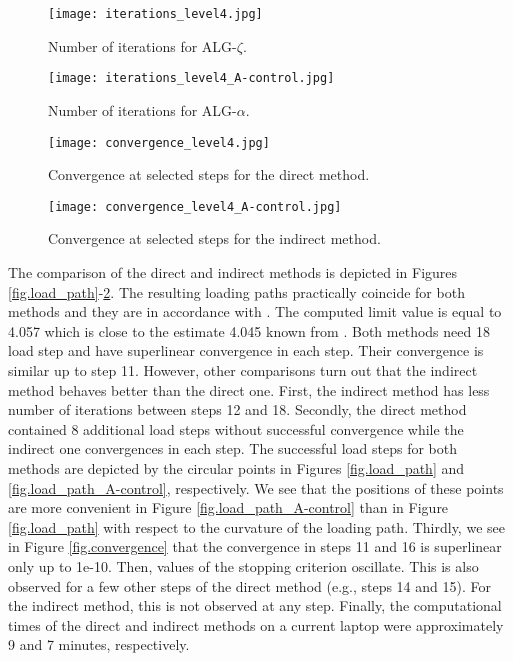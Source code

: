 \documentclass[a4paper,12pt]{article}
\theoremstyle{remark}
\numberwithin{equation}{section}
\begin{document}
\begin{figure}[htbp]
\begin{minipage}[t]{0.47\textwidth}
  \center
  \texttt{[image: iterations\_level4.jpg]}
   \caption{\small{Number of iterations for ALG-$\zeta$.}}
   \label{fig.iterations}
\end{minipage}
\hfill
\begin{minipage}[t]{0.47\textwidth}
  \center
   \texttt{[image: iterations\_level4\_A-control.jpg]}
   \caption{\small{Number of iterations for ALG-$\alpha$.}}
   \label{fig.iterations_A-control}
\end{minipage}
\end{figure}

\begin{figure}[htbp]
\begin{minipage}[t]{0.47\textwidth}
  \center
  \texttt{[image: convergence\_level4.jpg]}
   \caption{\small{Convergence at selected steps for the direct method.}}
   \label{fig.convergence}
\end{minipage}
\hfill
\begin{minipage}[t]{0.47\textwidth}
  \center
   \texttt{[image: convergence\_level4\_A-control.jpg]}
   \caption{\small{Convergence at selected steps for the indirect method.}}
   \label{fig.convergence_A-control}
\end{minipage}
\end{figure}

The comparison of the direct and indirect methods is depicted in Figures \ref{fig.load_path}-\ref{fig.convergence_A-control}. The resulting loading paths practically coincide for both methods and they are in accordance with \cite{NPO08, SCKKZB15, HRS16b}. The computed limit value is equal to 4.057 which is close to the estimate 4.045 known from \cite{CL90}. Both methods need 18 load step and have superlinear convergence in each step. Their convergence is similar up to step 11. However, other comparisons turn out that the indirect method behaves better than the direct one. First, the indirect method has less number of iterations between steps 12 and 18. Secondly, the direct method contained 8 additional load steps without successful convergence while the indirect one convergences in each step. The successful load steps for both methods are depicted  by the circular points in Figures \ref{fig.load_path} and \ref{fig.load_path_A-control}, respectively. We see that the positions of these points are more convenient in Figure \ref{fig.load_path_A-control} than in Figure \ref{fig.load_path} with respect to the curvature of the loading path. Thirdly, we see in Figure \ref{fig.convergence} that the convergence in steps 11 and 16 is superlinear only up to 1e-10. Then, values of the stopping criterion oscillate. This is also observed for a few other steps of the direct method (e.g., steps 14 and 15). For the indirect method, this is not observed at any step. Finally, the computational times of the direct and indirect methods on a current laptop were approximately 9 and 7 minutes, respectively.
\end{document}
